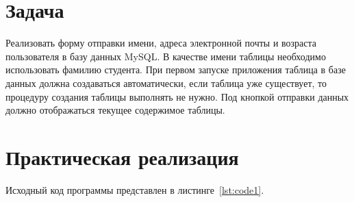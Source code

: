 \documentclass[a4paper, 14pt]{extarticle}
\begin{document}
\renewcommand{\ttdefault}{pcr}

\setlength{\tabcolsep}{3pt}
\newpage
\setcounter{page}{2}

\section{Задача}\label{Sect::task}

Реализовать форму отправки имени, адреса электронной почты и возраста пользователя в базу данных MySQL. В качестве имени таблицы необходимо использовать фамилию студента. При первом запуске приложения таблица в базе данных должна создаваться автоматически, если таблица уже существует, то процедуру создания таблицы выполнять не нужно. Под кнопкой отправки данных должно отображаться текущее содержимое таблицы.

\section{Практическая реализация}\label{Sect::code}

Исходный код программы представлен в листинге~\ref{lst:code1}.
\end{document}
